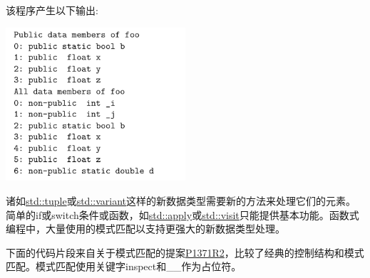该程序产生以下输出:

\begin{center}
\includegraphics[width=0.5\textwidth]{content/5/chapter8/images/8.png}\\
\end{center}


诸如\href{https://en.cppreference.com/w/cpp/utility/tuple}{std::tuple}或\href{https://en.cppreference.com/w/cpp/utility/variant}{std::variant}这样的新数据类型需要新的方法来处理它们的元素。简单的if或switch条件或函数，如\href{https://en.cppreference.com/w/cpp/utility/apply}{std::apply}或\href{https://en.cppreference.com/w/cpp/utility/variant/visit}{std::visit}只能提供基本功能。函数式编程中，大量使用的模式匹配以支持更强大的新数据类型处理。

下面的代码片段来自关于模式匹配的提案\href{http://www.open-std.org/jtc1/sc22/wg21/docs/papers/2020/p1371r2.pdf}{P1371R2}，比较了经典的控制结构和模式匹配。模式匹配使用关键字inspect和\_\_作为占位符。

